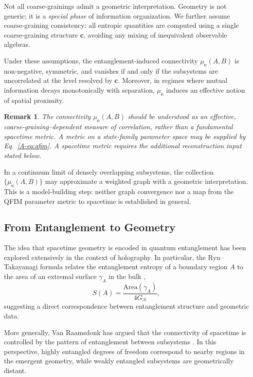 \documentclass[12pt,a4paper,openany]{book}
\newtheorem{remark}[theorem]{Remark}
\begin{document}
Not all coarse-grainings admit a geometric interpretation. 
Geometry is not generic; it is a \emph{special phase} of information organization.
We further assume coarse-graining consistency: all entropic quantities are computed using a single coarse-graining structure $\mathbf{c}$, avoiding any mixing of inequivalent observable algebras.

Under these assumptions, the entanglement-induced connectivity $\mu_{\mathbf{c}}(A,B)$ is non-negative, symmetric, and vanishes if and only if the subsystems are uncorrelated at the level resolved by $\mathbf{c}$.
Moreover, in regimes where mutual information decays monotonically with separation, $\mu_{\mathbf{c}}$ induces an effective notion of spatial proximity.

\begin{remark}
The connectivity $\mu_{\mathbf{c}}(A,B)$ should be understood as an \emph{effective, coarse-graining--dependent measure of correlation}, rather than a fundamental spacetime metric.
A metric on a state-family parameter space may be supplied by Eq.~\eqref{A-eq:qfim}.  A spacetime metric requires the additional reconstruction input stated below.
\end{remark}

In a continuum limit of densely overlapping subsystems, the collection $\{\mu_{\mathbf{c}}(A,B)\}$ may approximate a weighted graph with a geometric interpretation.  This is a model-building step: neither graph convergence nor a map from the QFIM parameter metric to spacetime is established in general.

\subsection{From Entanglement to Geometry}

The idea that spacetime geometry is encoded in quantum entanglement has been explored extensively in the context of holography.
In particular, the Ryu--Takayanagi formula relates the entanglement entropy of a boundary region $A$ to the area of an extremal surface $\gamma_A$ in the bulk \cite{RyuTakayanagi2006},
\begin{equation}
S(A) = \frac{\mathrm{Area}(\gamma_A)}{4G_N},
\end{equation}
suggesting a direct correspondence between entanglement structure and geometric data.

More generally, Van Raamsdonk has argued that the connectivity of spacetime is controlled by the pattern of entanglement between subsystems \cite{VanRaamsdonk2010}.
In this perspective, highly entangled degrees of freedom correspond to nearby regions in the emergent geometry, while weakly entangled subsystems are geometrically distant.
\end{document}
